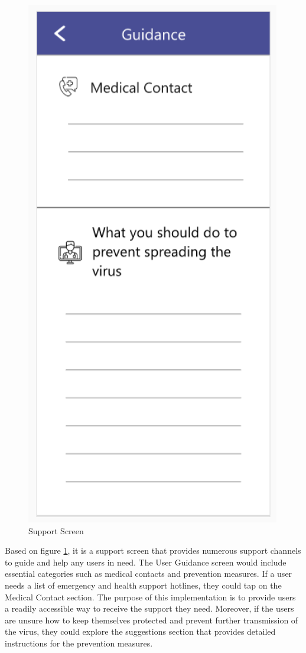\begin{enumerate}[a)]
          \begin{figure}[H]
            \centering
            \includegraphics[scale=1]{img/prototype/iter3-proto-4.png}
            \caption{Support Screen}
            \label{fig:iter3-proto-4}
          \end{figure}
          Based on figure \ref{fig:iter3-proto-4}, it is a support screen that provides numerous support channels to guide and help any users in need. The User Guidance screen would include essential categories such as medical contacts and prevention measures. If a user needs a list of emergency and health support hotlines, they could tap on the Medical Contact section. The purpose of this implementation is to provide users a readily accessible way to receive the support they need. Moreover, if the users are unsure how to keep themselves protected and prevent further transmission of the virus, they could explore the suggestions section that provides detailed instructions for the prevention measures.

\end{enumerate}
